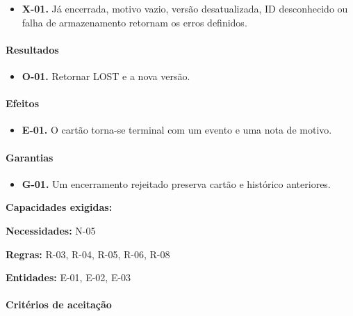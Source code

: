 \documentclass[10pt,a4paper]{article}
\begin{document}
\begin{itemize}

\item \textbf{X-01.} Já encerrada, motivo vazio, versão desatualizada, ID desconhecido ou falha de armazenamento retornam os erros definidos.

\end{itemize}

\paragraph{Resultados}

\begin{itemize}

\item \textbf{O-01.} Retornar LOST e a nova versão.

\end{itemize}

\paragraph{Efeitos}

\begin{itemize}

\item \textbf{E-01.} O cartão torna-se terminal com um evento e uma nota de motivo.

\end{itemize}

\paragraph{Garantias}

\begin{itemize}

\item \textbf{G-01.} Um encerramento rejeitado preserva cartão e histórico anteriores.

\end{itemize}

\textbf{Capacidades exigidas:}

\textbf{Necessidades:} N-05

\textbf{Regras:} R-03, R-04, R-05, R-06, R-08

\textbf{Entidades:} E-01, E-02, E-03

\paragraph{Critérios de aceitação}
\end{document}
